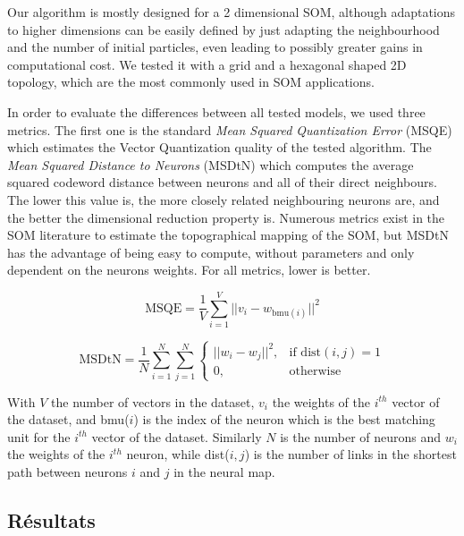 	Our algorithm is mostly designed for a 2 dimensional SOM, although adaptations to higher dimensions can be easily defined by just adapting the neighbourhood and the number of initial particles, even leading to possibly greater gains in computational cost. We tested it with a grid and a hexagonal shaped 2D topology, which are the most commonly used in SOM applications. 

	In order to evaluate the differences between all tested models, we used three metrics. The first one is the standard \textit{Mean Squared Quantization Error} (MSQE) which estimates the Vector Quantization quality of the tested algorithm. The \textit{Mean Squared Distance to Neurons} (MSDtN) which computes the average squared codeword distance between neurons and all of their direct neighbours. The lower this value is, the more closely related neighbouring neurons are, and the better the dimensional reduction property is. Numerous metrics exist in the SOM literature to estimate the topographical mapping of the SOM, but MSDtN has the advantage of being easy to compute, without parameters and only dependent on the neurons weights. For all metrics, lower is better. 

	\begin{equation}
    	\text{MSQE} = \frac{1}{V} \sum_{i=1}^{V} ||v_i - w_{\text{bmu}(i)}||^2
	\end{equation}

	\begin{equation}
    	\text{MSDtN} = \frac{1}{N} \sum_{i=1}^{N} \sum_{j=1}^{N} 
    	\begin{cases}
        	||w_i - w_j||^2,  & \text{if dist}(i, j) = 1\\
        	0,              & \text{otherwise}
    	\end{cases}
	\end{equation}

	With $V$ the number of vectors in the dataset, $v_i$ the weights of the $i^{th}$ vector of the dataset, and bmu($i$) is the index of the neuron which is the best matching unit for the $i^{th}$ vector of the dataset. Similarly $N$ is the number of neurons and $w_i$ the weights of the $i^{th}$ neuron, while dist($i, j$) is the number of links in the shortest path between neurons $i$ and $j$ in the neural map.

	\subsection{Résultats}
